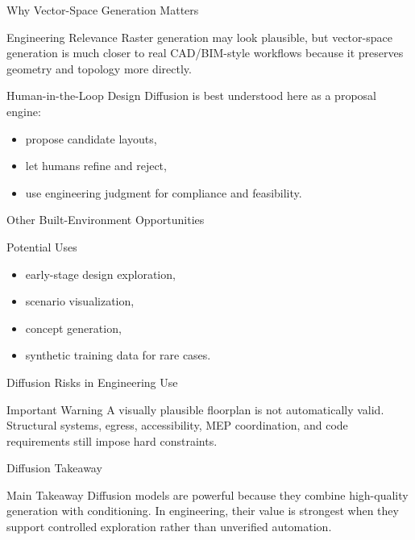 \documentclass[12pt]{beamer}
\begin{document}
\begin{frame}{Why Vector-Space Generation Matters}
  \begin{conceptbox}{Engineering Relevance}
    Raster generation may look plausible, but vector-space generation is much closer to real CAD/BIM-style workflows because it preserves geometry and topology more directly.
  \end{conceptbox}
\end{frame}

\begin{frame}{Human-in-the-Loop Design}
  Diffusion is best understood here as a proposal engine:
  \begin{itemize}
    \item propose candidate layouts,
    \item let humans refine and reject,
    \item use engineering judgment for compliance and feasibility.
  \end{itemize}
\end{frame}

\begin{frame}{Other Built-Environment Opportunities}
  \begin{examplebox}{Potential Uses}
    \begin{itemize}
      \item early-stage design exploration,
      \item scenario visualization,
      \item concept generation,
      \item synthetic training data for rare cases.
    \end{itemize}
  \end{examplebox}
\end{frame}

\begin{frame}{Diffusion Risks in Engineering Use}
  \begin{warningbox}{Important Warning}
    A visually plausible floorplan is not automatically valid. Structural systems, egress, accessibility, MEP coordination, and code requirements still impose hard constraints.
  \end{warningbox}
\end{frame}

\begin{frame}{Diffusion Takeaway}
  \begin{conceptbox}{Main Takeaway}
    Diffusion models are powerful because they combine high-quality generation with conditioning. In engineering, their value is strongest when they support controlled exploration rather than unverified automation.
  \end{conceptbox}
\end{frame}
\end{document}
